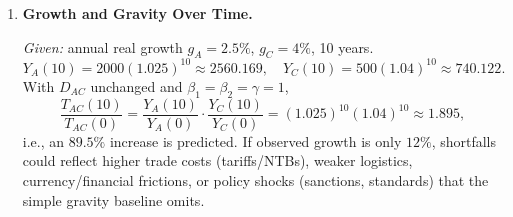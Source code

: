 \documentclass[11pt]{article}
\begin{document}
\begin{enumerate}[leftmargin=*, resume]
Adjustment: multiply baseline $T_{ij}$ by $(1+\lambda_{CL})$ if common language (CL) and by $(1-\lambda_{BOR})$ if a border friction applies. With $\lambda_{CL}=0.20$, $\lambda_{BOR}=0.30$ and all pairs separated by a border, while only $AB$ shares CL:
\[
\begin{aligned}
T_{AB}^{\text{adj}}&=T_{AB}\times (1{+}0.20)\times(1{-}0.30)
=0.000333\ldots \times 1.2 \times 0.7
=0.000280,\\
T_{AC}^{\text{adj}}&=T_{AC}\times 0.7
=0.000667\times 0.7
=0.000467,\\
T_{BC}^{\text{adj}}&=T_{BC}\times 0.7
=0.000250\times 0.7
=0.000175.
\end{aligned}
\]
\emph{Language effect percent increase for $AB$:} holding the border at $0.7$, the CL multiplies trade by $1.2$, i.e., $+20\%$.
\emph{Border friction that exactly offsets CL:} solve $(1+\lambda_{CL})(1-\lambda_{BOR})=1$:
\[
1.2\,(1-\lambda_{BOR})=1 \ \Rightarrow\ 1-\lambda_{BOR}=\tfrac{1}{1.2}=\tfrac{5}{6} \ \Rightarrow\ \lambda_{BOR}=\tfrac{1}{6}\approx 0.167.
\]

\item \textbf{Growth and Gravity Over Time.}

\emph{Given:} annual real growth $g_A=2.5\%$, $g_C=4\%$, 10 years.
\[
Y_A(10)=2000(1.025)^{10}\approx 2560.169,\quad
Y_C(10)=500(1.04)^{10}\approx 740.122.
\]
With $D_{AC}$ unchanged and $\beta_1=\beta_2=\gamma=1$,
\[
\frac{T_{AC}(10)}{T_{AC}(0)}
=\frac{Y_A(10)}{Y_A(0)}\cdot \frac{Y_C(10)}{Y_C(0)}
=(1.025)^{10}(1.04)^{10}\approx 1.895,
\]
i.e., an $89.5\%$ increase is predicted. If observed growth is only $12\%$, shortfalls could reflect higher trade costs (tariffs/NTBs), weaker logistics, currency/financial frictions, or policy shocks (sanctions, standards) that the simple gravity baseline omits.
\end{enumerate}





\newpage
\end{document}
